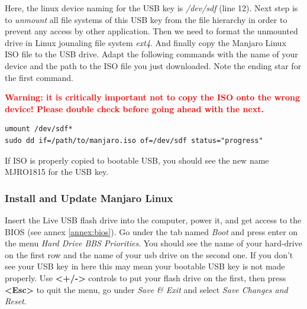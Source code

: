 Here, the linux device naming for the USB key is \emph{/dev/sdf} (line 12).
Next step is to \emph{unmount} all file systems of this USB key from
the file hierarchy in order to prevent any access by other application.
Then we need to format the unmounted drive in Linux jounaling file system
\emph{ext4}.
And finally copy the Manjaro Linux ISO file to the USB drive.
Adapt the following commands with the name of your device and the path to the
ISO file you just downloaded. Note the ending star for the first command.

\vspace{6pt}
\textbf{\textcolor{red}{Warning: it is critically important not to copy the ISO onto the
wrong device! Please double check before going ahead with the next.}}

\begin{lstlisting}
umount /dev/sdf*
sudo dd if=/path/to/manjaro.iso of=/dev/sdf status="progress"
\end{lstlisting}
If ISO is properly copied to bootable USB, you should see the new name 
MJRO1815 for the USB key.

\subsubsection{Install and Update Manjaro Linux}
Insert the Live USB flash drive into the computer, power it, and get access to the
BIOS (see annex \ref{annex:bios}). Go under the tab named \emph{Boot} and press enter 
on the menu \emph{Hard Drive BBS Priorities}. You should see the name of your hard-drive 
on the first row and the name of your usb drive on the second one. If you don't see your 
USB key in here this may mean your bootable USB key is not made properly.
Use \textbf{\textless+/-\textgreater} controls to put your flash drive on the first, 
then press \textbf{\textless Esc\textgreater} to quit the menu, go under 
\emph{Save \& Exit} and select \emph{Save Changes and Reset}.
\newline
\par

